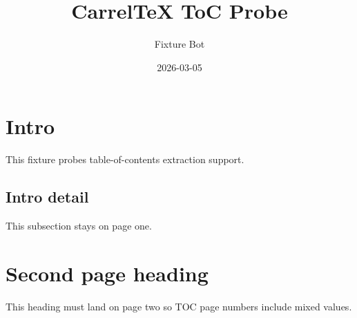 \documentclass{article}
\title{CarrelTeX ToC Probe}
\author{Fixture Bot}
\date{2026-03-05}
\begin{document}
\maketitle

\tableofcontents

\section{Intro}
This fixture probes table-of-contents extraction support.

\subsection{Intro detail}
This subsection stays on page one.

\pagebreak

\section{Second page heading}
This heading must land on page two so TOC page numbers include mixed values.
\end{document}
